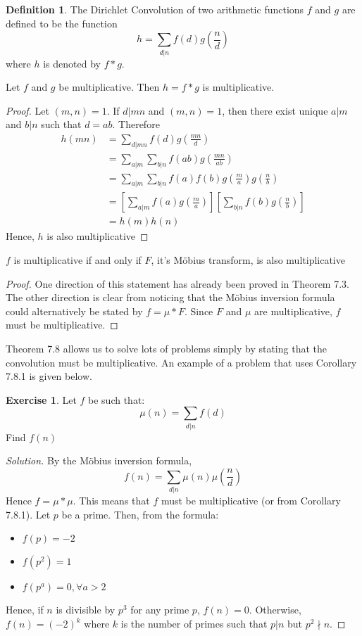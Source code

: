 \documentclass[12pt,letterpaper]{book}
\theoremstyle{definition}
\newtheorem{definition}{Definition} %
\newtheorem*{exercise}{Exercise}
\newenvironment{solution}
  {\renewcommand\qedsymbol{$\blacksquare$}\begin{proof}[Solution]}
  {\end{proof}}
\begin{document}
\begin{definition}
  The Dirichlet Convolution of two arithmetic functions $f$ and $g$ are defined to be the function
  \[h = \sum_{d|n} f(d) g \left(\frac{n}{d} \right)\]
  where $h$ is denoted by $f*g$.
\end{definition}

\begin{theorem}
  Let $f$ and $g$ be multiplicative. Then $h=f*g$ is multiplicative.
\end{theorem}
\begin{proof}
  Let $(m,n) = 1$. If $d|mn$ and $(m,n) = 1$, then there exist unique $a|m$ and $b|n$ such that $d=ab$. Therefore
  \begin{align*}
    h(mn) &= \sum_{d|mn} f(d)g \left( \frac{mn}{d} \right)  \\ 
          &= \sum_{a|m} \sum_{b|n} f(ab) g \left( \frac{mn}{ab} \right) \\
          &= \sum_{a|m} \sum_{b|n} f(a) f(b) g \left( \frac{m}{a} \right) g \left ( \frac{n}{b} \right) \\
          &= \left [ \sum_{a|m} f(a) g \left( \frac{m}{a}\right)\right] \left[ \sum_{b|n} f(b) g \left( \frac{n}{b} \right) \right] \\
          &= h(m) h(n)
  \end{align*}
  Hence, $h$ is also multiplicative
\end{proof}

\begin{corollary}
  $f$ is multiplicative if and only if $F$, it's M\"{o}bius transform, is also multiplicative
\end{corollary}
\begin{proof}
  One direction of this statement has already been proved in Theorem 7.3. The other direction is clear from noticing that the M\"{o}bius inversion formula could alternatively be stated by $f = \mu * F$. Since $F$ and $\mu$ are multiplicative, $f$ must be multiplicative.
\end{proof}

Theorem 7.8 allows us to solve lots of problems simply by stating that the convolution must be multiplicative. An example of a problem that uses Corollary 7.8.1 is given below.

\begin{exercise}
  Let $f$ be such that:
  \[\mu(n) = \sum_{d|n} f(d)\]
  Find $f(n)$
\end{exercise}
\begin{solution}
  By  the M\"{o}bius inversion formula,
  \[f(n) = \sum_{d|n} \mu(n) \mu \left(\frac{n}{d} \right)\]
  Hence $f = \mu * \mu$. This means that $f$ must be multiplicative (or from Corollary 7.8.1). Let $p$ be a prime. Then, from the formula:
  \begin{itemize}
    \item $f(p) = -2$
    \item $f(p^2) = 1$
    \item $f(p^a) = 0, \forall a > 2$
  \end{itemize}
  Hence, if $n$ is divisible by $p^3$ for any prime $p$, $f(n) = 0$. Otherwise, $f(n) = (-2)^k$ where $k$ is the number of primes such that $p|n$ but $p^2 \nmid n$.
\end{solution}
\end{document}
